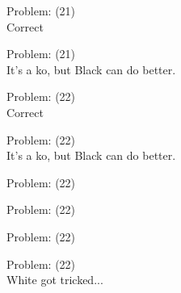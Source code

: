 \documentclass[11pt]{article}
\begin{document}
\begin{minipage}[t]{0.5\textwidth}
  {\centering
  
  Problem: (21)\\
  Correct\\
  }
\end{minipage}
\begin{minipage}[t]{0.5\textwidth}
  {\centering
  
  Problem: (21)\\
  It's a ko, but Black can do better.\\
  }
\end{minipage}
\begin{minipage}[t]{0.5\textwidth}
  {\centering
  
  Problem: (22)\\
  Correct\\
  }
\end{minipage}
\begin{minipage}[t]{0.5\textwidth}
  {\centering
  
  Problem: (22)\\
  It's a ko, but Black can do better.\\
  }
\end{minipage}
\begin{minipage}[t]{0.5\textwidth}
  {\centering
  
  Problem: (22)\\
  
  }
\end{minipage}
\begin{minipage}[t]{0.5\textwidth}
  {\centering
  
  Problem: (22)\\
  
  }
\end{minipage}
\begin{minipage}[t]{0.5\textwidth}
  {\centering
  
  Problem: (22)\\
  
  }
\end{minipage}
\begin{minipage}[t]{0.5\textwidth}
  {\centering
  
  Problem: (22)\\
  White got tricked...\\
  }
\end{minipage}
\end{document}
